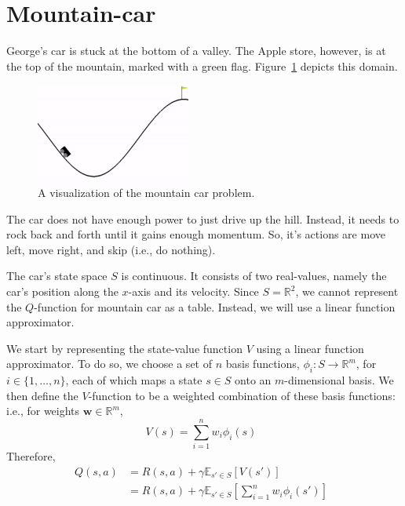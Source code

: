 \documentclass{article}
\begin{document}
\section{Mountain-car}
George's car is stuck at the bottom of a valley.  The Apple store,
however, is at the top of the mountain, marked with a green flag.
Figure~\ref{fig:mountain_car} depicts this domain.

\begin{figure}[ht!]
    \centering
    \includegraphics[width=2in]{mountain_car.png}
    \caption{A visualization of the mountain car problem.}
    \label{fig:mountain_car}
\end{figure}

The car does not have enough power to just drive up the hill.
Instead, it needs to rock back and forth until it gains enough
momentum.  So, it's actions are move left, move right, and skip (i.e.,
do nothing).

The car's state space $S$ is continuous.  It consists of two
real-values, namely the car's position along the $x$-axis and its
velocity.  Since $S = \mathbb{R}^2$, we cannot represent the
$Q$-function for mountain car as a table.  Instead, we will use a
linear function approximator.

We start by representing the state-value function $V$ using a linear
function approximator.  To do so, we choose a set of $n$ basis
functions, $\phi_i: S \to \mathbb{R}^{m}$, for $i \in \{ 1, \ldots, n
\}$, each of which maps a state $s \in S$ onto an $m$-dimensional
basis.  We then define the $V$-function to be a weighted combination
of these basis functions: i.e., for weights $\bm{w} \in \mathbb{R}^m$,
\begin{equation}
V(s) = \sum_{i = 1}^{n} w_i \phi_i (s) \enspace
\end{equation}
Therefore, 
\begin{align}
Q(s,a)
&= R(s,a) + \gamma \mathbb{E}_{s' \in S} \left[ V (s') \right] \\
&= R(s,a) + \gamma \mathbb{E}_{s' \in S} \left[ \sum_{i = 1}^{n} w_i \phi_i (s') \right] \enspace
\end{align}
\end{document}
